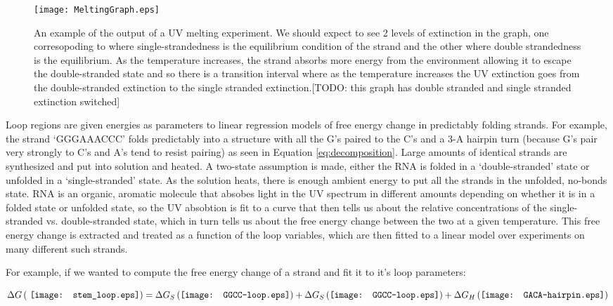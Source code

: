 \begin{figure}[h]
\centering
\texttt{[image: MeltingGraph.eps]}

\caption{An example of the output of a UV melting experiment. We
  should expect to see 2 levels of extinction in the graph, one
  corresopoding to where single-strandedness is the equilibrium
  condition of the strand and the other where double strandedness is
  the equilibrium. As the temperature increases, the strand absorbs
  more energy from the environment allowing it to escape the
  double-stranded state and so there is a transition interval where as
  the temperature increases the UV extinction goes from the
  double-stranded extinction to the single stranded extinction.[TODO:
    this graph has double stranded and single stranded extinction
    switched]}
\label{fig:UVMeltGraph}
\end{figure}

Loop regions are given energies as parameters to linear regression
models of free energy change in predictably folding strands. For
example, the strand `GGGAAACCC' folds predictably into a structure
with all the G's paired to the C's and a 3-A hairpin turn (because G's
pair very strongly to C's and A's tend to resist pairing) as seen in
Equation \ref{eq:decomposition}. Large amounts of identical strands
are synthesized and put into solution and heated. A two-state
assumption is made, either the RNA is folded in a `double-stranded'
state or unfolded in a `single-stranded' state. As the solution heats,
there is enough ambient energy to put all the strands in the unfolded,
no-bonds state. RNA is an organic, aromatic molecule that absobes
light in the UV spectrum in different amounts depending on whether it
is in a folded state or unfolded state, so the UV absobtion is fit to
a curve that then tells us about the relative concentrations of the
single-stranded vs. double-stranded state, which in turn tells us
about the free energy change between the two at a given
temperature. This free energy change is extracted and treated as a
function of the loop variables, which are then fitted to a linear
model over experiments on many different such strands.

For example, if we wanted to compute the free energy change of a
strand and fit it to it's loop parameters:

\begin{equation}
\Delta G \left ( \vcenter{\hbox{ \texttt{[image: stem\_loop.eps]}}}
 \right ) =
\Delta G_S \left ( \vcenter{\hbox{\texttt{[image: GGCC-loop.eps]}}}
\right ) +
\Delta G_S \left ( \vcenter{\hbox{\texttt{[image: GGCC-loop.eps]}}}
\right ) + 
\Delta G_H \left (\vcenter{\hbox{\texttt{[image: GACA-hairpin.eps]}}}
\right ) 
\end{equation}

